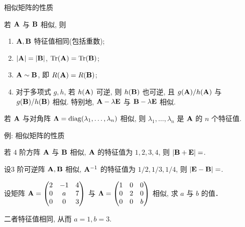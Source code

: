 \begin{frame}{相似矩阵的性质}
	\onslide<+->
	\begin{theorem}
		若 ${\mathbf{A}}$ 与 ${\mathbf{B}}$ 相似, 则
		\begin{enumerate}
			\item \alert{${\mathbf{A}},{\mathbf{B}}$ 特征值相同(包括重数)};
			\item \alert{$|{\mathbf{A}}|=|{\mathbf{B}}|$, ${\mathrm{Tr}}({\mathbf{A}})={\mathrm{Tr}}({\mathbf{B}})$};
			\item ${\mathbf{A}}\sim{\mathbf{B}}$, 即 \alert{$R({\mathbf{A}})=R({\mathbf{B}})$};
			\item 对于多项式 $g,h$, 若 $h({\mathbf{A}})$ 可逆, 则 $h({\mathbf{B}})$ 也可逆, 且 $g({\mathbf{A}})/h({\mathbf{A}})$ 与 $g({\mathbf{B}})/h({\mathbf{B}})$ 相似.
			特别地, ${\mathbf{A}}-\lambda{\mathbf{E}}$ 与 ${\mathbf{B}}-\lambda{\mathbf{E}}$ 相似.
		\end{enumerate}
	\end{theorem}
	\onslide<+->
	\begin{corollary}
		若 ${\mathbf{A}}$ 与对角阵 ${\boldsymbol{\Lambda}}={\mathrm{diag}}(\lambda_1,\dots,\lambda_n)$ 相似, 则 $\lambda_1,\dots,\lambda_n$ 是 ${\mathbf{A}}$ 的 $n$ 个特征值.
	\end{corollary}
\end{frame}


\begin{frame}{例: 相似矩阵的性质}
	\onslide<+->
	\begin{example}
		若 $4$ 阶方阵 ${\mathbf{A}}$ 与 ${\mathbf{B}}$ 相似, ${\mathbf{A}}$ 的特征值为 $1,2,3,4$, 则 $|{\mathbf{B}}+{\mathbf{E}}|=$.
	\end{example}
	\onslide<+->
	\begin{example}
		设$3$ 阶可逆阵 ${\mathbf{A}},{\mathbf{B}}$ 相似, ${\mathbf{A}}^{-1}$ 的特征值为 $1/2,1/3,1/4$, 则 $|{\mathbf{E}}-{\mathbf{B}}|=$\fillblank{\visible<+->{$-6$}}.
	\end{example}
	\onslide<+->
	\begin{example}
		设矩阵 ${\mathbf{A}}=\begin{pmatrix}
			2&-1&4\\
			0&a&7\\
			0&0&3
		\end{pmatrix}$ 与 ${\boldsymbol{\Lambda}}=\begin{pmatrix}
			1&0&0\\
			0&2&0\\
			0&0&b
		\end{pmatrix}$ 相似, 求 $a$ 与 $b$ 的值．
	\end{example}
	\onslide<+->
	\begin{solution}
		二者特征值相同, 从而 $a=1,b=3$.
	\end{solution}
\end{frame}


